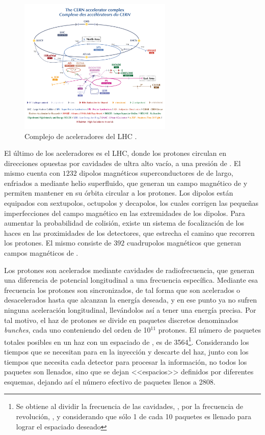 \begin{figure}
  \centering
  \includegraphics[width=0.65\textwidth]{images/lhc/LHC_complex.png}
  \caption{Complejo de aceleradores del LHC \cite{Lopienska:2800984}.}
  \label{fig:LHC_complex}
\end{figure}

El último de los aceleradores es el LHC, donde los protones circulan en direcciones opuestas por cavidades de ultra alto vacío, a una presión de . El mismo cuenta con $1232$ dipolos magnéticos superconductores de  de largo, enfriados a  mediante helio superfluido, que generan un campo magnético de  y permiten mantener en su órbita circular a los protones. Los dipolos están equipados con sextupolos, octupolos y decapolos, los cuales corrigen las pequeñas imperfecciones del campo magnético en las extremidades de los dipolos. Para aumentar la probabilidad de colisión, existe un sistema de focalización de los haces en las proximidades de los detectores, que estrecha el camino que recorren los protones. El mismo consiste de $392$ cuadrupolos magnéticos que generan campos magnéticos de .

Los protones son acelerados mediante cavidades de radiofrecuencia, que generan una diferencia de potencial longitudinal a una frecuencia específica. Mediante esa frecuencia los protones son sincronizados, de tal forma que son acelerados o desacelerados hasta que alcanzan la energía deseada, y en ese punto ya no sufren ninguna aceleración longitudinal, llevándolos así a tener una energía precisa. Por tal motivo, el haz de protones se divide en paquetes discretos denominados \textit{bunches}, cada uno conteniendo del orden de 10$^{11}$ protones. El número de paquetes totales posibles en un haz con un espaciado de , es de 3564\footnote{Se obtiene al dividir la frecuencia de las cavidades, , por la frecuencia de revolución, , y considerando que sólo 1 de cada 10 paquetes es llenado para lograr el espaciado deseado}. Considerando los tiempos que se necesitan para en la inyección y descarte del haz, junto con los tiempos que necesita cada detector para procesar la información, no todos los paquetes son llenados, sino que se dejan <<espacios>> definidos por diferentes esquemas, dejando así el número efectivo de paquetes llenos a 2808.

